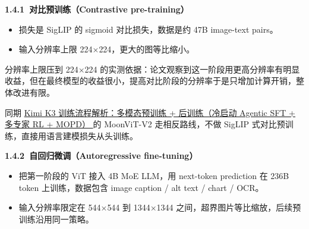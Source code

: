 \documentclass[zihao=false,fontset=windows]{ctexart}
\begin{document}
\par{}\vspace{0.8em}\noindent \begin{tcolorbox}[boxrule=0pt,arc=3pt,colback=callGreen,left=3pt,right=3pt,top=2pt,bottom=2pt,before skip=0pt,after skip=0pt]{\bfseries \textcolor{feishuBlue}{1.4.1}\ 对比预训练（Contrastive pre-training）}\end{tcolorbox}\par\vspace{0.28em}
\begin{itemize}
\item 
损失是 SigLIP 的 sigmoid 对比损失，数据是约 47B image-text pairs。\par
\item 
输入分辨率上限 224$\times$224，更大的图等比缩小。\par
\end{itemize}

\begin{feishuquote}

分辨率上限压到 224$\times$224 的实测依据：论文观察到这一阶段用更高分辨率有明显收益，但在最终模型的收益很小，提高对比阶段的分辨率于是只增加计算开销，整体改进有限。\par
\end{feishuquote}

同期 \href{https://scnajei2ds6y.feishu.cn/wiki/OOC2wZ3npiGJSIk1YvNcW83Mnvg}{Kimi K3 训练流程解析：多模态预训练 + 后训练（冷启动 Agentic SFT + 多专家 RL + MOPD） } 的 MoonViT-V2 走相反路线，不做 SigLIP 式对比预训练，直接用语言建模损失从头训练。\par

\par{}\vspace{0.8em}\noindent \begin{tcolorbox}[boxrule=0pt,arc=3pt,colback=callGreen,left=3pt,right=3pt,top=2pt,bottom=2pt,before skip=0pt,after skip=0pt]{\bfseries \textcolor{feishuBlue}{1.4.2}\ 自回归微调（Autoregressive fine-tuning）}\end{tcolorbox}\par\vspace{0.28em}
\begin{itemize}
\item 
把第一阶段的 ViT 接入 4B MoE LLM，用 next-token prediction 在 236B token 上训练，数据包含 image caption / alt text / chart / OCR。\par
\item 
输入分辨率限定在 544$\times$544 到 1344$\times$1344 之间，超界图片等比缩放，后续预训练沿用同一策略。\par
\end{itemize}
\end{document}
